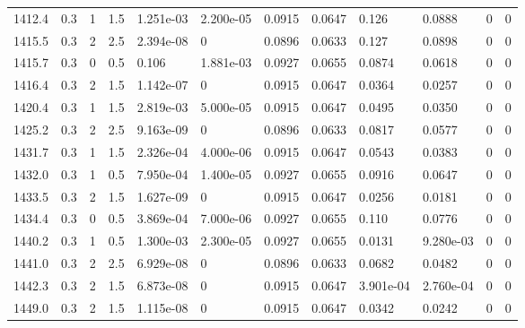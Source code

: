 \documentclass[preview]{standalone}
\begin{document}
{{{{{{{{\begin{tabular}{L{1.2cm}C{1.2cm} C{0.3cm}C{0.5cm} C{1.4cm}C{1.4cm} C{1.4cm}C{1.4cm} C{1.6cm}C{1.6cm} C{1.6cm}C{1.6cm}}
  1412.4  &   0.3  & 1     & 1.5 &  1.251e-03  & 2.200e-05  &  0.0915&   0.0647& 0.126 & 0.0888   &  0 & 0  \\ 
  1415.5  &   0.3  & 2     & 2.5 &  2.394e-08  & 0  &  0.0896&   0.0633& 0.127 & 0.0898   &  0 & 0  \\ 
  1415.7  &   0.3  & 0     & 0.5 &  0.106  & 1.881e-03  &  0.0927&   0.0655& 0.0874 & 0.0618   &  0 & 0  \\ 
  1416.4  &   0.3  & 2     & 1.5 &  1.142e-07  & 0  &  0.0915&   0.0647& 0.0364 & 0.0257   &  0 & 0  \\ 
  1420.4  &   0.3  & 1     & 1.5 &  2.819e-03  & 5.000e-05  &  0.0915&   0.0647& 0.0495 & 0.0350   &  0 & 0  \\ 
  1425.2  &   0.3  & 2     & 2.5 &  9.163e-09  & 0  &  0.0896&   0.0633& 0.0817 & 0.0577   &  0 & 0  \\ 
  1431.7  &   0.3  & 1     & 1.5 &  2.326e-04  & 4.000e-06  &  0.0915&   0.0647& 0.0543 & 0.0383   &  0 & 0  \\ 
  1432.0  &   0.3  & 1     & 0.5 &  7.950e-04  & 1.400e-05  &  0.0927&   0.0655& 0.0916 & 0.0647   &  0 & 0  \\ 
  1433.5  &   0.3  & 2     & 1.5 &  1.627e-09  & 0  &  0.0915&   0.0647& 0.0256 & 0.0181   &  0 & 0  \\ 
  1434.4  &   0.3  & 0     & 0.5 &  3.869e-04  & 7.000e-06  &  0.0927&   0.0655& 0.110 & 0.0776   &  0 & 0  \\ 
  1440.2  &   0.3  & 1     & 0.5 &  1.300e-03  & 2.300e-05  &  0.0927&   0.0655& 0.0131 & 9.280e-03   &  0 & 0  \\ 
  1441.0  &   0.3  & 2     & 2.5 &  6.929e-08  & 0  &  0.0896&   0.0633& 0.0682 & 0.0482   &  0 & 0  \\ 
  1442.3  &   0.3  & 2     & 1.5 &  6.873e-08  & 0  &  0.0915&   0.0647& 3.901e-04 & 2.760e-04   &  0 & 0  \\ 
  1449.0  &   0.3  & 2     & 1.5 &  1.115e-08  & 0  &  0.0915&   0.0647& 0.0342 & 0.0242   &  0 & 0  \\ 
\hline 
\end{tabular} 

}}}}}}}}
\end{document}

